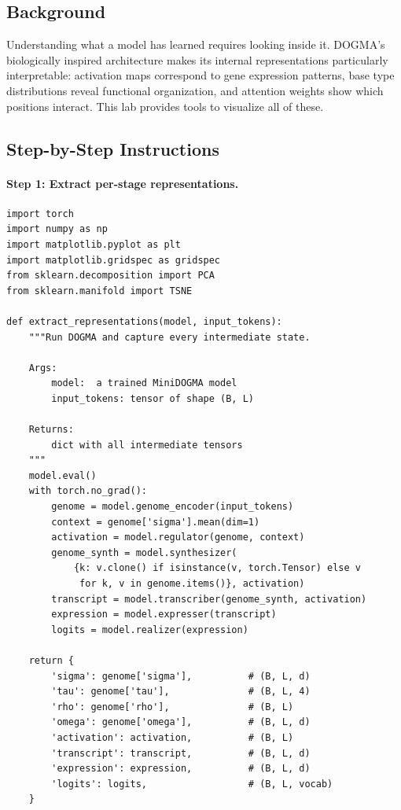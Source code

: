 \subsection{Background}

Understanding what a model has learned requires looking inside it. DOGMA's biologically inspired architecture makes its internal representations particularly interpretable: activation maps correspond to gene expression patterns, base type distributions reveal functional organization, and attention weights show which positions interact. This lab provides tools to visualize all of these.

\subsection{Step-by-Step Instructions}

\paragraph{Step 1: Extract per-stage representations.}

\begin{lstlisting}[style=dogmapython, caption={Lab 8: Extracting internal representations from DOGMA.}]
import torch
import numpy as np
import matplotlib.pyplot as plt
import matplotlib.gridspec as gridspec
from sklearn.decomposition import PCA
from sklearn.manifold import TSNE

def extract_representations(model, input_tokens):
    """Run DOGMA and capture every intermediate state.

    Args:
        model:  a trained MiniDOGMA model
        input_tokens: tensor of shape (B, L)

    Returns:
        dict with all intermediate tensors
    """
    model.eval()
    with torch.no_grad():
        genome = model.genome_encoder(input_tokens)
        context = genome['sigma'].mean(dim=1)
        activation = model.regulator(genome, context)
        genome_synth = model.synthesizer(
            {k: v.clone() if isinstance(v, torch.Tensor) else v
             for k, v in genome.items()}, activation)
        transcript = model.transcriber(genome_synth, activation)
        expression = model.expresser(transcript)
        logits = model.realizer(expression)

    return {
        'sigma': genome['sigma'],          # (B, L, d)
        'tau': genome['tau'],              # (B, L, 4)
        'rho': genome['rho'],              # (B, L)
        'omega': genome['omega'],          # (B, L, d)
        'activation': activation,          # (B, L)
        'transcript': transcript,          # (B, L, d)
        'expression': expression,          # (B, L, d)
        'logits': logits,                  # (B, L, vocab)
    }
\end{lstlisting}

